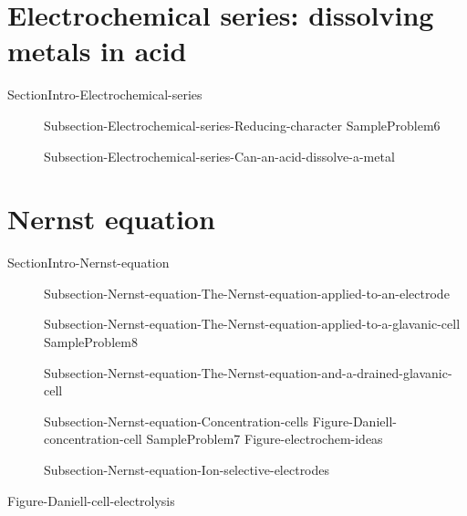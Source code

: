 \documentclass[main.tex]{subfiles}
\begin{document}
\section{Electrochemical series: dissolving metals in acid}{SectionIntro-Electrochemical-series}
\sloppy\begin{description}
   \item[] {Subsection-Electrochemical-series-Reducing-character}
  {SampleProblem6}
\item[] {Subsection-Electrochemical-series-Can-an-acid-dissolve-a-metal}
\end{description}


\section{Nernst equation}{SectionIntro-Nernst-equation}
\sloppy\begin{description}
   \item[] {Subsection-Nernst-equation-The-Nernst-equation-applied-to-an-electrode}
   \item[] {Subsection-Nernst-equation-The-Nernst-equation-applied-to-a-glavanic-cell}
     {SampleProblem8}
   \item[] {Subsection-Nernst-equation-The-Nernst-equation-and-a-drained-glavanic-cell}
   \item[] {Subsection-Nernst-equation-Concentration-cells}
{Figure-Daniell-concentration-cell}
  {SampleProblem7}
 {Figure-electrochem-ideas}
   \item[] {Subsection-Nernst-equation-Ion-selective-electrodes}

\end{description}

 {Figure-Daniell-cell-electrolysis}
\end{document}

